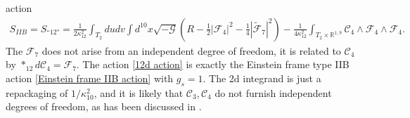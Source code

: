 action
\begin{equation}
\begin{aligned}
S_{IIB}=
S_{\text{``12"}}
= \frac{1}{2\kappa_{12}^2}\int_{T_2}dudv\int d^{10}x
\sqrt{-\mathcal G}
\left(
R - \frac{1}{2}|\mathcal F_4|^2-\frac{1}{4}|\tilde{\mathcal{F}}_7|^2
\right)-\frac{1}{4\kappa_{12}^2}\int_{T_2\times \mathbb{R}^{1,9}}\mathcal C_4\wedge \mathcal F_4\wedge \mathcal F_4.
\end{aligned}
\label{12d action}
\end{equation}
The $\mathcal F_7$ does not arise from an independent degree of freedom, it is related to $\mathcal C_4$ by $*_{12}d\mathcal C_4 = \mathcal F_7$.
The action \eqref{12d action} is exactly the Einstein frame type IIB action \eqref{Einstein frame IIB action} with $g_s=1$.
The 2d integrand is just a repackaging of $1/\kappa_{10}^2$, and it is likely that $\mathcal C_3, \mathcal C_4$ do not furnish independent degrees of freedom, as has been discussed in \cite{Tseytlin:1996ne}.